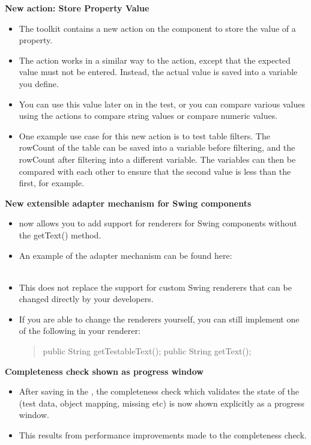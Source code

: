 \textbf{New action: Store Property Value}\\
\begin{itemize}
\item The  toolkit contains a new action on the  component to store the value of a property.
\item The action works in a similar way to the  action, except that the expected value must not be entered. Instead, the actual value is saved into a variable you define.
\item You can use this value later on in the test, or you can compare various values using the actions to compare string values or compare numeric values. 
\item One example use case for this new action is to test table filters. The rowCount of the table can be saved into a variable before filtering, and the rowCount after filtering into a different variable. The variables can then be compared with each other to ensure that the second value is less than the first, for example.
\end{itemize} 

\textbf{New extensible adapter mechanism for Swing components}\\
\begin{itemize}
\item \app{} now allows you to add support for renderers for Swing components without the getText() method.
\item An example of the adapter mechanism can be found here:\\
\\
\item This does not replace the support for custom Swing renderers that can be changed directly by your developers. 
\item If you are able to change the renderers yourself, you can still implement one of the following in your renderer:
\begin{quote}
public String getTestableText();
public String getText();
\end{quote}
\end{itemize}

\textbf{Completeness check shown as progress window}\\
\begin{itemize}
\item After saving in the \ite{}, the completeness check which validates the state of the \gdproject{} (test data, object mapping, missing \gdcases{} etc) is now shown explicitly as a progress window.
\item This results from performance improvements made to the completeness check.
\end{itemize} 


